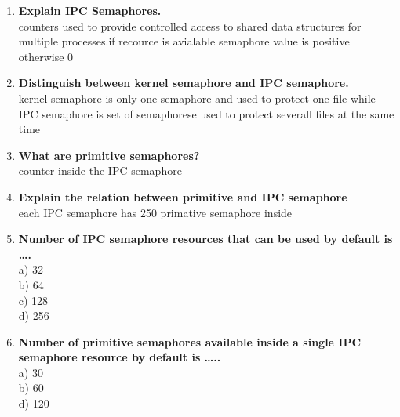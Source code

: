 \documentclass[a4paper,12pt]{article}
\begin{document}
\begin{flushleft}
\begin{enumerate}
\item \textbf{ Explain IPC Semaphores.}\\
{\color{red}counters used to provide controlled access to shared data structures for multiple processes.if recource is avialable semaphore value is positive otherwise 0}\\
\item \textbf{ Distinguish between kernel semaphore and IPC semaphore.}\\
{\color{red}kernel semaphore is only one semaphore and used to protect one file while IPC semaphore is set of semaphorese used to protect severall files at the same time}\\
\item \textbf{ What are primitive semaphores?}\\
{\color{red}counter inside the IPC semaphore}\\
\item \textbf{ Explain the relation between primitive and IPC semaphore}\\
{\color{red}each IPC semaphore has 250 primative semaphore inside}\\
\item \textbf{ Number of IPC semaphore resources that can be used by default is ….}\\
a) 32 \\

b) 64 \\

{\color{red}c) 128 }\\
d) 256 \\
\item \textbf{ Number of primitive semaphores available inside a single IPC semaphore resource by default is …..}\\
a) 30 \\

b) 60 \\

d) 120 \\


\end{enumerate}
\end{flushleft}
\end{document}
